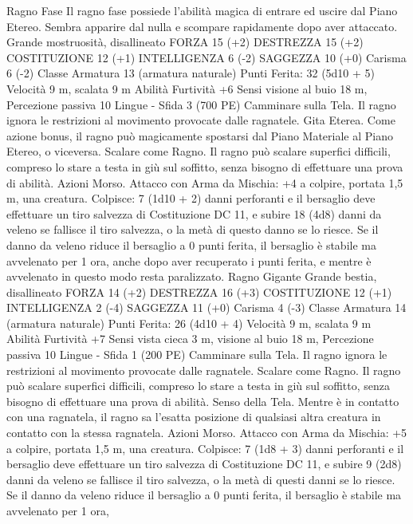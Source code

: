 \begin{multicols}{2}
Ragno Fase
Il ragno fase possiede l’abilità magica di entrare ed
uscire dal Piano Etereo. Sembra apparire dal nulla e
scompare rapidamente dopo aver attaccato.
Grande mostruosità, disallineato
FORZA 15 (+2)
DESTREZZA 15 (+2)
COSTITUZIONE 12 (+1)
INTELLIGENZA 6 (-2)
SAGGEZZA 10 (+0)
Carisma 6 (-2)
Classe Armatura 13 (armatura naturale)
\hspace*{0pt}\hfill{Punti Ferita}: 32 (5d10 + 5)
Velocità 9 m, scalata 9 m
Abilità Furtività +6
Sensi visione al buio 18 m, Percezione passiva 10
Lingue -
Sfida 3 (700 PE)
Camminare sulla Tela. Il ragno ignora le restrizioni al
movimento provocate dalle ragnatele.
Gita Eterea. Come azione bonus, il ragno può magicamente
spostarsi dal Piano Materiale al Piano Etereo, o viceversa.
Scalare come Ragno. Il ragno può scalare superfici difficili,
compreso lo stare a testa in giù sul soffitto, senza bisogno di
effettuare una prova di abilità.
Azioni
Morso. Attacco con Arma da Mischia: +4 a colpire, portata 1,5
m, una creatura.
Colpisce: 7 (1d10 + 2) danni perforanti e il bersaglio deve
effettuare un tiro salvezza di Costituzione DC 11, e subire 18
(4d8) danni da veleno se fallisce il tiro salvezza, o la metà di
questo danno se lo riesce. Se il danno da veleno riduce il
bersaglio a 0 punti ferita, il bersaglio è stabile ma avvelenato per
1 ora, anche dopo aver recuperato i punti ferita, e mentre è
avvelenato in questo modo resta paralizzato.
Ragno Gigante
Grande bestia, disallineato
FORZA 14 (+2)
DESTREZZA 16 (+3)
COSTITUZIONE 12 (+1)
INTELLIGENZA 2 (-4)
SAGGEZZA 11 (+0)
Carisma 4 (-3)
Classe Armatura 14 (armatura naturale)
\hspace*{0pt}\hfill{Punti Ferita}: 26 (4d10 + 4)
Velocità 9 m, scalata 9 m
Abilità Furtività +7
Sensi vista cieca 3 m, visione al buio 18 m, Percezione passiva
10
Lingue -
Sfida 1 (200 PE)
Camminare sulla Tela. Il ragno ignora le restrizioni al
movimento provocate dalle ragnatele.
Scalare come Ragno. Il ragno può scalare superfici difficili,
compreso lo stare a testa in giù sul soffitto, senza bisogno di
effettuare una prova di abilità.
Senso della Tela. Mentre è in contatto con una ragnatela, il
ragno sa l’esatta posizione di qualsiasi altra creatura in contatto
con la stessa ragnatela.
Azioni
Morso. Attacco con Arma da Mischia: +5 a colpire, portata 1,5
m, una creatura.
Colpisce: 7 (1d8 + 3) danni perforanti e il bersaglio deve
effettuare un tiro salvezza di Costituzione DC 11, e subire 9
(2d8) danni da veleno se fallisce il tiro salvezza, o la metà di
questi danni se lo riesce. Se il danno da veleno riduce il bersaglio
a 0 punti ferita, il bersaglio è stabile ma avvelenato per 1 ora,

\end{multicols}
